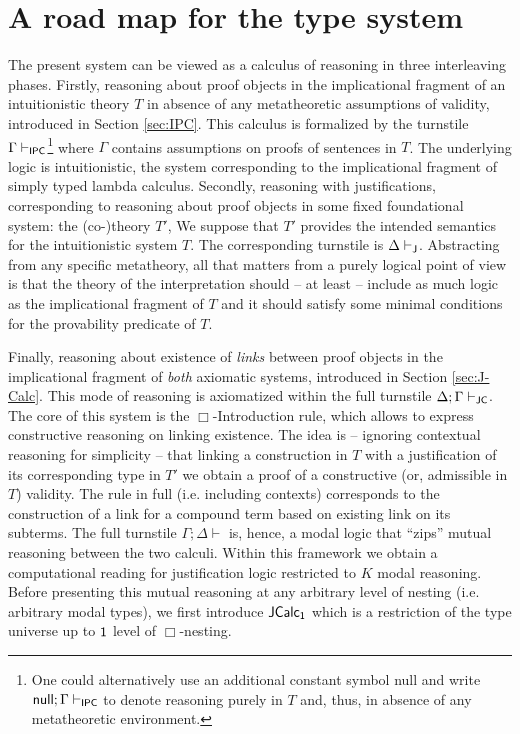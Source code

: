 \section{A road map for the type system}
The present system can be viewed as a calculus of reasoning in three interleaving phases.
%
Firstly, reasoning about proof objects in the implicational fragment of an intuitionistic theory $T$ in absence of any metatheoretic assumptions of validity, introduced in Section \ref{sec:IPC}. This calculus is formalized by the turnstile $\Gamma\vdash_{\sf IPC}$\footnote{One could alternatively use an additional constant symbol {\sf null} and write ${\sf null};\Gamma\vdash_{\sf IPC}$ to denote reasoning  purely in $T$ and, thus, in absence of any metatheoretic environment.}  where $\Gamma$ contains assumptions on proofs of sentences in $T$. The underlying logic is intuitionistic, the system corresponding to the implicational fragment of  simply typed lambda calculus.
%
Secondly, reasoning with justifications, corresponding to reasoning  about proof objects in some fixed 
foundational system: the (co-)theory $T'$, %
We suppose that $T'$ provides the intended semantics for the intuitionistic system $T$. 
The corresponding turnstile is $\Delta \vdash_{\sf J}$. Abstracting from any specific metatheory, 
all that matters  from a  purely logical point of view is that the theory of the interpretation 
should -- at least -- include as much logic as the implicational fragment of $T$ and 
it should satisfy some minimal conditions for the  provability predicate  of $T$. 

Finally, reasoning  about existence of \textit{links} between proof objects in the implicational fragment of \textit{both} axiomatic systems, introduced in Section \ref{sec:J-Calc}. This mode of reasoning is axiomatized within the full turnstile $\Delta;\Gamma\vdash_{\sf JC}$. The core of this system is  the $\Box$-Introduction rule, which allows to express constructive reasoning on linking existence. The idea is -- ignoring contextual reasoning for simplicity -- that linking a construction in $T$ with a justification of its corresponding type in $T'$ we obtain a proof of a constructive (or, admissible in $T$) validity. The rule in full (i.e. including contexts) corresponds to the construction of a link for a compound term based on existing link on its subterms.   
The full turnstile $\Gamma; \Delta\vdash$ is, hence, a modal logic that ``zips'' mutual reasoning between the two calculi. Within this framework we obtain a computational reading for justification logic restricted to $K$ modal reasoning. Before presenting this mutual reasoning at any arbitrary level of nesting (i.e. arbitrary modal types), we first introduce ${\sf JCalc_1}$ which is a restriction of the type universe up to ${\sf 1}$ level of $\Box$-nesting.

